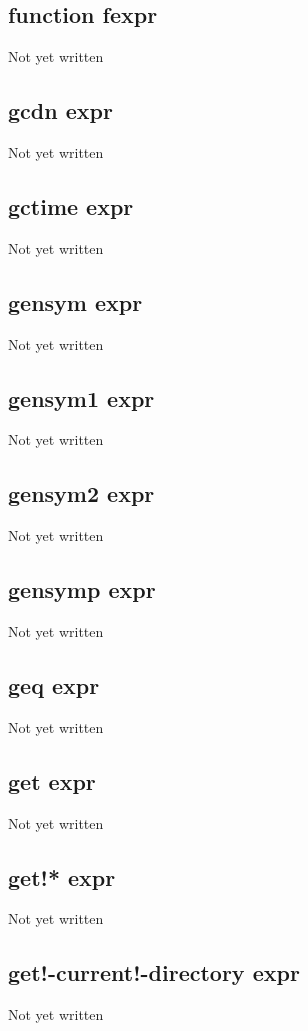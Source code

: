 \documentclass[a4paper,11pt]{article}
\begin{document}
{\subsection{\ttfamily function fexpr}
Not yet written

\subsection{\ttfamily gcdn expr}
Not yet written

\subsection{\ttfamily gctime expr}
Not yet written

\subsection{\ttfamily gensym expr}
Not yet written

\subsection{\ttfamily gensym1 expr}
Not yet written

\subsection{\ttfamily gensym2 expr}
Not yet written

\subsection{\ttfamily gensymp expr}
Not yet written

\subsection{\ttfamily geq expr}
Not yet written

\subsection{\ttfamily get expr}
Not yet written

\subsection{\ttfamily get!* expr}
Not yet written

\subsection{\ttfamily get!-current!-directory expr}
Not yet written

}
\end{document}
